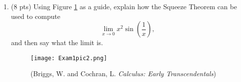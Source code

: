 \documentclass[11pt,letterpaper]{article}
\begin{document}
\begin{enumerate}
\begin{enumerate}
\vspace{5pc}
\item (3 pts) $\lim_{x\to 0}g(x)$

\vspace{5pc}
\item (1 pt) $g(0)$
\end{enumerate}

\vspace{3pc} 
(2 pts) Does $g$ have a vertical asymptote at the line $x=0$?  Explain why or why not.

\vspace{5pc}
\begin{center}Now suppose $h(x)=\begin{cases}g(x) & x< 0 \\
	0 & x\geq 0 \end{cases}$.  \end{center}
	
Evaluate: 
\begin{enumerate}
\item (2 pts) $\lim_{x\to 0^+}h(x)$

\vspace{5pc} 
\item (3 pts) $\lim_{x\to 0^-}h(x)$  

\vspace{5pc}
\item (2 pts) $\lim_{x\to 0}h(x)$

\vspace{5pc}	
\item (1 pt) $h(0)$

\end{enumerate}
\vspace{3pc}
(2 pts) Does $h$ have a vertical asymptote at the line $x=0$?  Explain why or why not.

\newpage
\item (8 pts) Using Figure \ref{fig:pic2} as a guide, explain how the Squeeze Theorem can be used to compute 
\[\lim_{x\to 0}x^2\sin\left(\frac{1}{x}\right),\] 
and then say what the limit is.
\vspace{-1pc}  
\begin{figure}[h]
\begin{center}
\texttt{[image: Exam1pic2.png]}
\caption{(Briggs, W. and Cochran, L. \emph{Calculus: Early Transcendentals})}\label{fig:pic2}
\end{center}
\end{figure}


\end{enumerate}
\end{document}
